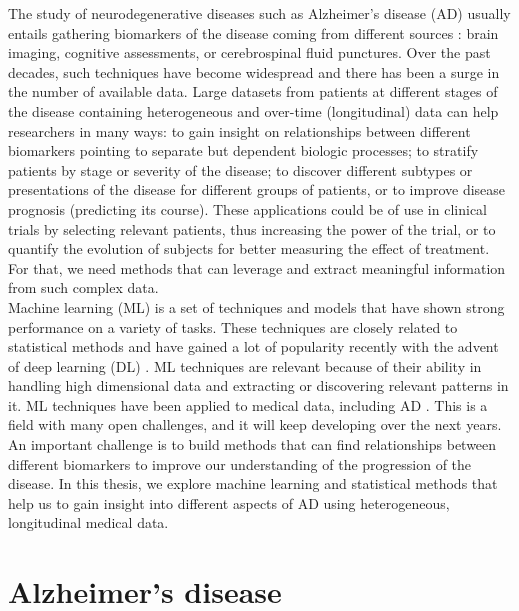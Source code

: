 The study of neurodegenerative diseases such as Alzheimer's disease (AD) usually entails gathering biomarkers of the disease coming from different sources \cite{Jack2010}: brain imaging, cognitive assessments, or cerebrospinal fluid punctures. Over the past decades, such techniques have become widespread and there has been a surge in the number of available data. Large datasets from patients at different stages of the disease containing heterogeneous and over-time (longitudinal) data can help researchers in many ways: to gain insight on relationships between different biomarkers pointing to separate but dependent biologic processes; to stratify patients by stage or severity of the disease; to discover different subtypes or presentations of the disease for different groups of patients, or to improve disease prognosis (predicting its course). These applications could be of use in clinical trials by selecting relevant patients, thus increasing the power of the trial, or to quantify the evolution of subjects for better measuring the effect of treatment. For that, we need methods that can leverage and extract meaningful information from such complex data. \\

Machine learning (ML) is a set of techniques and models that have shown strong performance on a variety of tasks. These techniques are closely related to statistical methods and have gained a lot of popularity recently with the advent of deep learning (DL) \cite{LeCun2015}. ML techniques are relevant because of their ability in handling high dimensional data and extracting or discovering relevant patterns in it. ML techniques have been applied to medical data, including AD \cite{Litjens2017,Ching2018}. This is a field with many open challenges, and it will keep developing over the next years. An important challenge is to build methods that can find relationships between different biomarkers to improve our understanding of the progression of the disease. In this thesis, we explore machine learning and statistical methods that help us to gain insight into different aspects of AD using heterogeneous, longitudinal medical data. \\

\section{Alzheimer's disease}

